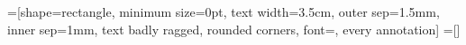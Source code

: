 
=[shape=rectangle,
                        minimum size=0pt,
                        text width=3.5cm,
                        outer sep=1.5mm,
                        inner sep=1mm,
                        text badly ragged,
                        rounded corners,
                        font=\pgfutil@font@tiny,
                        every annotation]
=[]



\endinput

